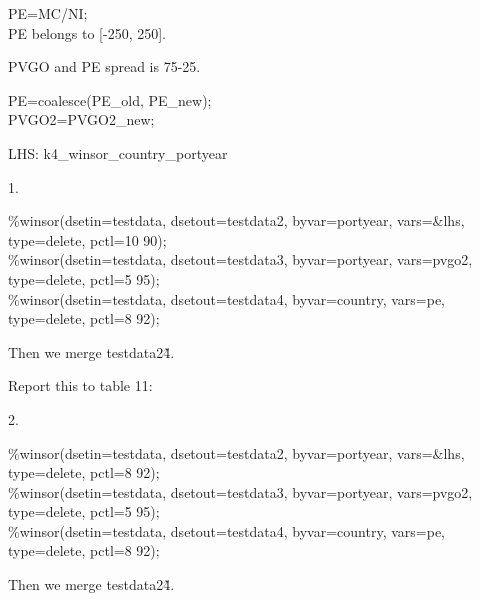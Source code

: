 

\usepackage[T1]{fontenc}




\thispagestyle{fancy}

\newcommand{\code}{\texttt}
\newcommand*{\Commonpath}{20190621}


PE=MC/NI;\\
PE belongs to [-250, 250].

PVGO and PE spread is 75-25.

PE=coalesce(PE\_old, PE\_new);\\
PVGO2=PVGO2\_new;

LHS: k4\_winsor\_country\_portyear


1. 

\%winsor(dsetin=testdata, dsetout=testdata2, byvar=portyear, vars=\&lhs, type=delete, pctl=10 90);\\
\%winsor(dsetin=testdata, dsetout=testdata3, byvar=portyear, vars=pvgo2, type=delete, pctl=5 95);\\
\%winsor(dsetin=testdata, dsetout=testdata4, byvar=country, vars=pe, type=delete, pctl=8 92);

Then we merge testdata2\~4.

Report this to table 11:






2. 

\%winsor(dsetin=testdata, dsetout=testdata2, byvar=portyear, vars=\&lhs, type=delete, pctl=8 92);\\
\%winsor(dsetin=testdata, dsetout=testdata3, byvar=portyear, vars=pvgo2, type=delete, pctl=5 95);\\
\%winsor(dsetin=testdata, dsetout=testdata4, byvar=country, vars=pe, type=delete, pctl=8 92);

Then we merge testdata2\~4.







